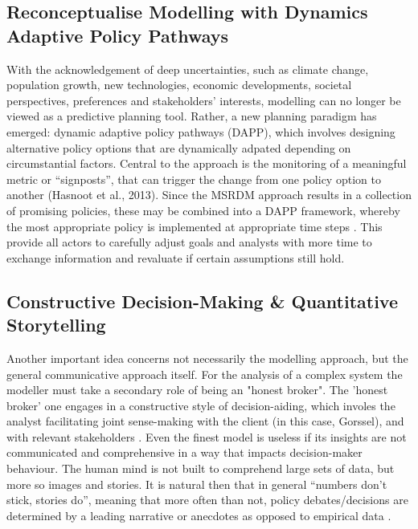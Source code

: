 \subsection{Reconceptualise Modelling with Dynamics Adaptive Policy Pathways}

With the acknowledgement of deep uncertainties, such as climate change, population growth, new technologies, economic developments, societal perspectives, preferences and stakeholders’ interests, modelling can no longer be viewed as a predictive planning tool. Rather, a new planning paradigm has emerged: dynamic adaptive policy pathways (DAPP), which involves designing alternative policy options that are dynamically adpated depending on circumstantial factors. Central to the approach is the monitoring of a meaningful metric or “signposts”, that can trigger the change from one policy option to another (Hasnoot et al., 2013). Since the MSRDM approach results in a collection of promising policies, these may be combined into a DAPP framework, whereby the most appropriate policy is implemented at appropriate time steps \parencite{kwakkel_developing_2015}. This provide all actors to carefully adjust goals and analysts with more time to exchange information and revaluate if certain assumptions still hold. 

\subsection{Constructive Decision-Making \& Quantitative Storytelling}

Another important idea concerns not necessarily the modelling approach, but the general communicative approach itself. For the analysis of a complex system the modeller must take a secondary role of being an "honest broker". The 'honest broker' one engages in a constructive style of decision-aiding, which involes the analyst facilitating joint sense-making with the client (in this case, Gorssel), and with relevant stakeholders \parencite{tsoukias_decision_2008}. Even the finest model is useless if its insights are not communicated and comprehensive in a way that impacts decision-maker behaviour. The human mind is not built to comprehend large sets of data, but more so images and stories. It is natural then that in general “numbers don’t stick, stories do”, meaning that more often than not, policy debates/decisions are determined by a leading narrative or anecdotes as opposed to empirical data \parencite{kettl_making_2016}.  

